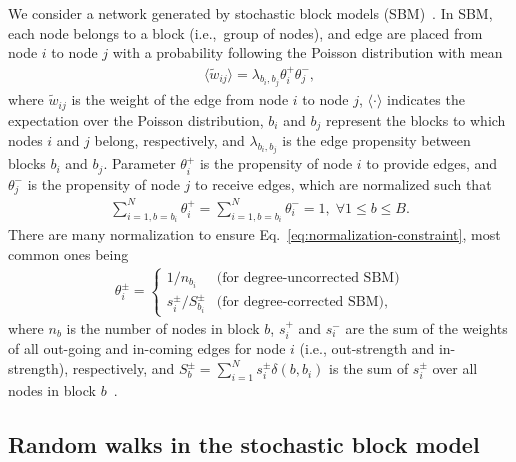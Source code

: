 \documentclass[12pt]{article} %
\def\ie{i.e.,~}
\begin{document}
We consider a network generated by stochastic block models (SBM)~\cite{Karrer2011}.
In SBM, each node belongs to a block (\ie group of nodes), and edge are placed from node $i$ to node $j$ with a probability following the Poisson distribution with mean
\begin{align}
    \label{eq:dcsbm}
    \langle \tilde w_{ij} \rangle = \lambda_{b_i,b_j} \theta^{+}_i \theta^{-}_j,
\end{align}
where $\tilde w_{ij}$ is the weight of the edge from node $i$ to node $j$, $\langle\cdot\rangle$ indicates the expectation over the Poisson distribution, $b_i$ and $b_j$ represent the blocks to which nodes $i$ and $j$ belong, respectively, and $\lambda_{b_i,b_j}$ is the edge propensity between blocks $b_i$ and $b_j$.
Parameter $\theta_i ^+$ is the propensity of node $i$ to provide edges, and $\theta_j ^-$ is the propensity of node $j$ to receive edges, which are normalized such that
\begin{align}
    \sum_{i=1, b = b_i}^N \theta_i ^+  =\sum_{i=1, b = b_i}^N \theta_i ^- = 1,\; \forall 1\leq b \leq B. \label{eq:normalization-constraint}
\end{align}
There are many normalization to ensure Eq.~\eqref{eq:normalization-constraint}, most common ones being
\begin{align}
    \label{eq:node_propensity}
    \theta_i ^{\pm} = \left\{
        \begin{array}{ll}
            1/n_{b_i} & \text{(for degree-uncorrected SBM)} \\
            s_i ^\pm / S_{b_i}^{\pm} & \text{(for degree-corrected SBM)},
        \end{array}
    \right.
\end{align}
where $n_b$ is the number of nodes in block $b$, $s^{+}_i$ and $s^{-}_i$ are the sum of the weights of all out-going and in-coming edges for node $i$ (i.e., out-strength and in-strength), respectively, and
$S_b ^{\pm} = \sum_{i=1}^N s_i ^{\pm} \delta(b, b_i)$ is the sum of $s^{\pm}_i$ over all nodes in block $b$~\cite{Karrer2011}.

\subsection{Random walks in the stochastic block model}
\end{document}
